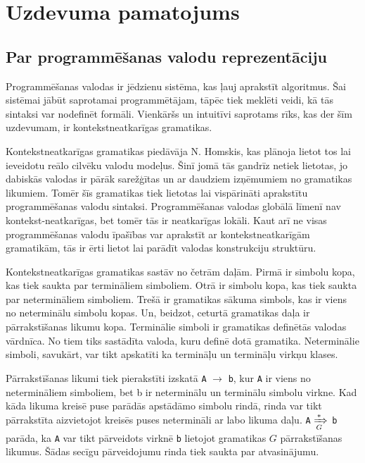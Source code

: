\section{\label{sec:extendedbullshit}Uzdevuma pamatojums}

\subsection{Par programmēšanas valodu reprezentāciju}

Programmēšanas valodas ir jēdzienu sistēma, kas ļauj aprakstīt algoritmus. Šai sistēmai jābūt saprotamai programmētājam, tāpēc tiek meklēti veidi, kā tās sintaksi var nodefinēt formāli. Vienkāršs un intuitīvi saprotams rīks, kas der šīm uzdevumam, ir kontekstneatkarīgas gramatikas.

Kontekstneatkarīgas gramatikas piedāvāja N. Homskis, kas plānoja lietot tos lai ieveidotu reālo cilvēku valodu modeļus. Šinī jomā tās gandrīz netiek lietotas, jo dabiskās valodas ir pārāk sarežģītas un ar daudziem izņēmumiem no gramatikas likumiem. Tomēr šīs gramatikas tiek lietotas lai vispārināti aprakstītu programmēšanas valodu sintaksi. Programmēšanas valodas globālā līmenī nav kontekst-neatkarīgas, bet tomēr tās ir neatkarīgas lokāli. Kaut arī ne visas programmēšanas valodu īpašības var aprakstīt ar kontekstneatkarīgām gramatikām, tās ir ērti lietot lai parādīt valodas konstrukciju struktūru.

Kontekstneatkarīgas gramatikas sastāv no četrām daļām. Pirmā ir simbolu kopa, kas tiek saukta par termināliem simboliem. Otrā ir simbolu kopa, kas tiek saukta par netermināliem simboliem. Trešā ir gramatikas sākuma simbols, kas ir viens no neterminālu simbolu kopas. Un, beidzot, ceturtā gramatikas daļa ir pārrakstīšanas likumu kopa. Terminālie simboli ir gramatikas definētās valodas vārdnīca. No tiem tiks sastādīta valoda, kuru definē dotā gramatika. Neterminālie simboli, savukārt, var tikt apskatīti ka termināļu un termināļu virkņu klases.

Pārrakstīšanas likumi tiek pierakstīti izskatā \verb|A| $\rightarrow$ \verb|b|, kur \verb|A| ir viens no netermināliem simboliem, bet b ir neterminālu un terminālu simbolu virkne. Kad kāda likuma kreisē puse parādās apstādāmo simbolu rindā, rinda var tikt pārrakstīta aizvietojot kreisēs puses netermināli ar labo likuma daļu. \verb|A| $\xRightarrow[G]{*}$ \verb|b| parāda, ka \verb|A| var tikt pārveidots virknē \verb|b| lietojot gramatikas $G$ pārrakstīšanas likumus. Šādas secīgu pārveidojumu rinda tiek saukta par atvasinājumu. \cite{Shutt:AdaptiveGrammars}

